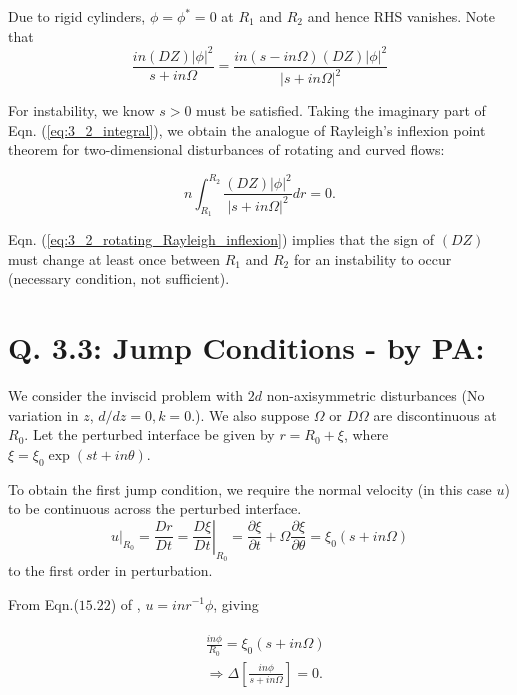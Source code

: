 Due to rigid cylinders, $\phi = \phi^{*} = 0$ at $R_{1}$ and $R_{2}$ and hence RHS vanishes. Note that
\begin{equation}
\frac{in(DZ)|\phi|^{2}}{s + in\Omega} = \frac{in(s - in\Omega)(DZ)|\phi|^{2}}{|s + in\Omega|^{2}} 
\end{equation}

For instability, we know $ s > 0$ must be satisfied. Taking the imaginary part of Eqn. (\ref{eq:3_2_integral}), we obtain the analogue of Rayleigh's inflexion point theorem for two-dimensional disturbances of rotating and curved flows:

\begin{equation}\label{eq:3_2_rotating_Rayleigh_inflexion}
 n\int_{R_{1}}^{R_{2}}\frac{(DZ)|\phi|^{2}}{|s + in\Omega|^{2}} dr = 0. 
\end{equation}

Eqn. (\ref{eq:3_2_rotating_Rayleigh_inflexion}) implies that the sign of $(DZ)$ must change at least once between $R_{1}$ and $R_{2}$ for an instability to occur (necessary condition, not sufficient). 
\section{Q. 3.3: Jump Conditions - by PA:}
We consider the inviscid problem with $2d$ non-axisymmetric disturbances (No variation in $z$, $d/dz = 0, k = 0$.). We also suppose $\Omega$ or $D\Omega$ are discontinuous at $R_{0}$. Let the perturbed interface be given by $ r = R_{0} + \xi$, where $\xi = \xi_{0}\exp{(st + in\theta)}$.

To obtain the first jump condition, we require the normal velocity (in this case $u$) to be continuous across the perturbed interface. 
\begin{equation}\label{eq:3_3_u_continuity}
 u|_{R_{0}} = \frac{Dr}{Dt} = \left.\frac{D\xi}{Dt}\right\vert_{R_{0}} = \frac{\partial \xi}{\partial t} + \Omega \frac{\partial \xi}{\partial \theta} = \xi_{0}(s + in\Omega) 
\end{equation}
to the first order in perturbation. 

From Eqn.($15.22$) of \cite{drazin2004hydrodynamic}, $u = inr^{-1}\phi$, giving

\begin{align}\label{eq:3_3_first_jump_cond}
\begin{split}
 & \frac{in\phi}{R_{0}} = \xi_{0}(s + in\Omega)\\
 & \Rightarrow \boxed{\Delta \left[\frac{in \phi}{s + in\Omega} \right] = 0}.
\end{split}
\end{align}


